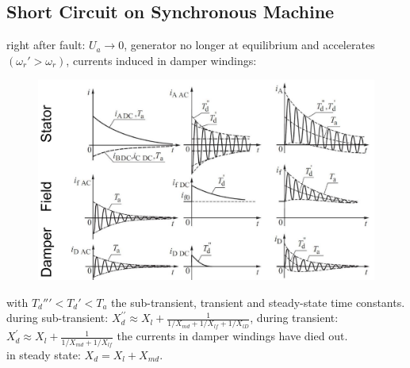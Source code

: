 \documentclass[a4paper,10pt,landscape]{scrartcl}
\begin{document}
\begin{multicols*}{3}
\subsection{Short Circuit on Synchronous Machine}
right after fault: $U_a\rightarrow 0$, generator no longer at equilibrium and accelerates $(\omega_r'>\omega_r)$, currents induced in damper windings: 
\begin{figure}[H]
    \centering
    \includegraphics[width=1\linewidth]{src/sync_machine_SC.png}
\end{figure}
with $T_d''\prime<T_d'<T_a$ the sub-transient, transient and steady-state time constants. \\
during sub-transient: $X_d^{\prime \prime} \approx X_l+\frac{1}{1 / X_{m d}+1 / X_{l f}+1 / X_{l D}}$, during transient: $X_d^{\prime} \approx X_l+\frac{1}{1 / X_{m d}+1 / X_{l f}}$ the currents in damper windings have died out. \\
in steady state: $X_d=X_l + X_{md}$.


\end{multicols*}
\end{document}
